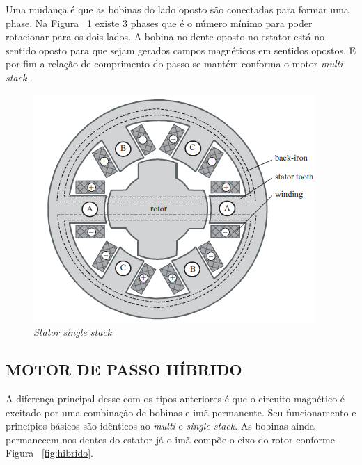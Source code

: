 Uma mudança é que as bobinas do lado oposto são conectadas para formar uma phase. Na Figura ~\ref{fig:singlestack} existe 3 phases que é o número mínimo para poder rotacionar para os dois lados. A bobina no dente oposto no estator está no sentido oposto para que sejam gerados campos magnéticos em sentidos opostos. E por fim a relação de comprimento do passo se mantém conforma o motor \emph{multi stack} \cite{acarnley2002stepping}.

\begin{figure}[htp]
	\centering
	\includegraphics[scale=1]{images/single_stack.png}
	\caption{\emph{Stator single stack}}	
	\label{fig:singlestack}	
\end{figure}

\subsection{MOTOR DE PASSO HÍBRIDO}
A diferença principal desse com os tipos anteriores é que o circuito magnético é excitado por uma combinação de bobinas e imã permanente. Seu funcionamento e princípios básicos são idênticos ao \emph{multi} e \emph{single stack}. As bobinas ainda permanecem nos dentes do estator já o imã compõe o eixo do rotor conforme Figura ~\ref{fig:hibrido}.

